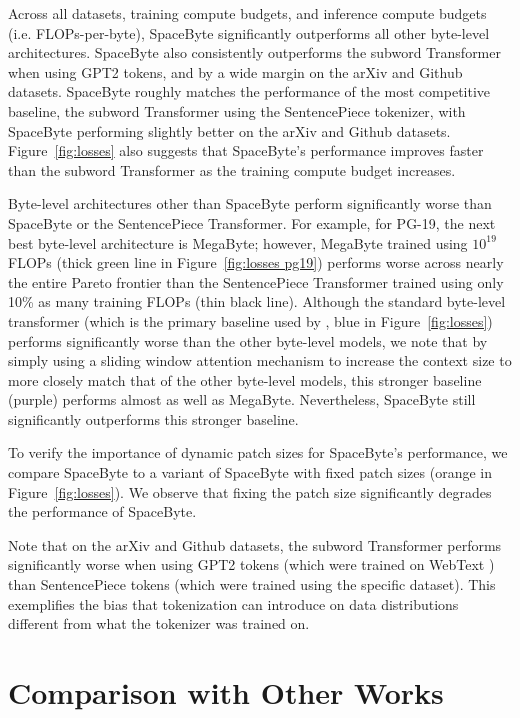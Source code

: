 Across all datasets, training compute budgets, and inference compute budgets (i.e. FLOPs-per-byte), SpaceByte significantly outperforms all other byte-level architectures. SpaceByte also consistently outperforms the subword Transformer when using GPT2 tokens, and by a wide margin on the arXiv and Github datasets. SpaceByte roughly matches the performance of the most competitive baseline, the subword Transformer using the SentencePiece tokenizer, with SpaceByte performing slightly better on the arXiv and Github datasets.
Figure~\ref{fig:losses} also suggests that SpaceByte's performance improves faster than the subword Transformer as the training compute budget increases.

Byte-level architectures other than SpaceByte perform significantly worse than SpaceByte or the SentencePiece Transformer. For example, for PG-19, the next best byte-level architecture is MegaByte; however, MegaByte trained using $10^{19}$ FLOPs (thick green line in Figure~\ref{fig:losses pg19}) performs worse across nearly the entire Pareto frontier than the SentencePiece Transformer trained using only 10\% as many training FLOPs (thin black line). Although the standard byte-level transformer (which is the primary baseline used by \citet{megabyte}, blue in Figure~\ref{fig:losses}) performs significantly worse than the other byte-level models, we note that by simply using a sliding window attention mechanism to increase the context size to more closely match that of the other byte-level models, this stronger baseline (purple) performs almost as well as MegaByte. Nevertheless, SpaceByte still significantly outperforms this stronger baseline.

To verify the importance of dynamic patch sizes for SpaceByte's performance, we compare SpaceByte to a variant of SpaceByte with fixed patch sizes (orange in Figure~\ref{fig:losses}).
We observe that fixing the patch size significantly degrades the performance of SpaceByte.

Note that on the arXiv and Github datasets, the subword Transformer performs significantly worse when using GPT2 tokens (which were trained on WebText \cite{radford2019gpt2}) than SentencePiece tokens (which were trained using the specific dataset). This exemplifies the bias that tokenization can introduce on data distributions different from what the tokenizer was trained on.

\section{Comparison with Other Works}
\label{sec:other works}

